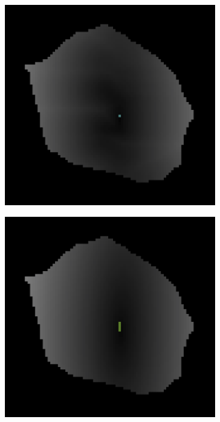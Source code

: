 \begin{figure}[htpb]
\begin{subfigure}[b]{\mywidth}
		\caption{\label{fig:im_seg}}
	\end{subfigure}
	\hspace{3mm}
	\begin{subfigure}[b]{\mywidth}
		\centering
		\includegraphics[width=\textwidth]{data/images/interpolation/dtx_linear.png}
		\caption{\label{fig:dtx_linear}}
	\end{subfigure}
	\hspace{3mm}
	\begin{subfigure}[b]{\mywidth}
		\centering
		\includegraphics[width=\textwidth]{data/images/interpolation/dtx_spline.png}

\end{subfigure}
\end{figure}

